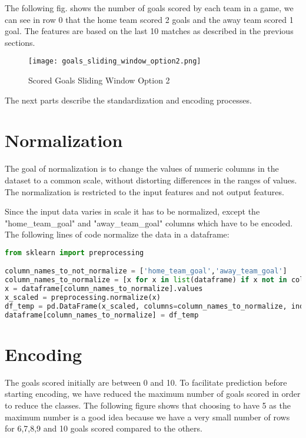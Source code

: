 The following fig. shows the number of goals scored by each team in a game, we can see in row 0 that the home team scored 2 goals and the away team scored 1 goal. The features are based on the last 10 matches as described in the previous sections.


\begin{figure}[H]
\begin{center}
\texttt{[image: goals\_sliding\_window\_option2.png]}
\end{center}
\caption{Scored Goals Sliding Window Option 2}
\label{fig:scored_sliding_window_option2}
\end{figure}

The next parts describe the standardization and encoding processes.


\section {Normalization}
The goal of normalization is to change the values of numeric columns in the dataset to a common scale, without distorting differences in the ranges of values. The normalization is restricted to the input features and not output features.

Since the input data varies in scale it has to be normalized, except the "home\_team\_goal" and "away\_team\_goal" columns which have to be encoded.
The following lines of code normalize the data in a dataframe:

\begin{lstlisting}[language=Python, caption=Scored goals Python code for normalization]
from sklearn import preprocessing

column_names_to_not_normalize = ['home_team_goal','away_team_goal']
column_names_to_normalize = [x for x in list(dataframe) if x not in column_names_to_not_normalize ]
x = dataframe[column_names_to_normalize].values
x_scaled = preprocessing.normalize(x)
df_temp = pd.DataFrame(x_scaled, columns=column_names_to_normalize, index = dataframe.index)
dataframe[column_names_to_normalize] = df_temp
\end{lstlisting}


\section {Encoding}

The goals scored initially are between 0 and 10.
To facilitate prediction before starting encoding, we have reduced the maximum number of goals scored in order to reduce the classes. The following figure shows that choosing to have 5 as the maximum number is a good idea because we have a very small number of rows for 6,7,8,9 and 10 goals scored compared to the others.

